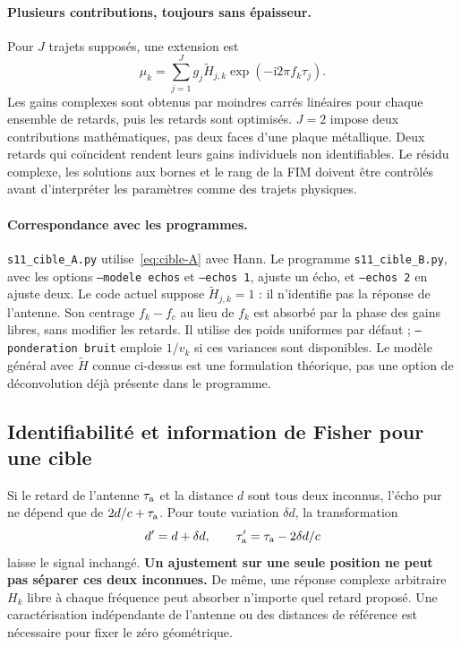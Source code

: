 \documentclass[11pt,a4paper]{article}
\newcommand{\ii}{\mathrm{i}}
\begin{document}
\paragraph{Plusieurs contributions, toujours sans épaisseur.}
Pour $J$ trajets supposés, une extension est
\begin{equation}
 \mu_k=\sum_{j=1}^{J}g_j\widetilde H_{j,k}
               \exp(-\ii2\pi f_k\tau_j).
\end{equation}
Les gains complexes sont obtenus par moindres carrés linéaires pour chaque
ensemble de retards, puis les retards sont optimisés. $J=2$ impose deux
contributions mathématiques, pas deux faces d'une plaque métallique.
Deux retards qui coïncident rendent leurs gains individuels non identifiables.
Le résidu complexe, les solutions aux bornes et le rang de la FIM doivent
être contrôlés avant d'interpréter les paramètres comme des trajets physiques.

\paragraph{Correspondance avec les programmes.}
\texttt{s11\_cible\_A.py} utilise~\eqref{eq:cible-A} avec Hann.
Le programme \texttt{s11\_cible\_B.py}, avec les options
\texttt{--modele echos} et \texttt{--echos 1}, ajuste un écho,
et \texttt{--echos 2} en ajuste deux. Le code actuel suppose
$\widetilde H_{j,k}=1$ : il n'identifie pas la réponse de l'antenne.
Son centrage $f_k-f_c$ au lieu de $f_k$ est absorbé par la phase des gains
libres, sans modifier les retards. Il utilise des poids uniformes par défaut ;
\texttt{--ponderation bruit} emploie $1/v_k$ si ces variances sont disponibles.
Le modèle général avec $\widetilde H$ connue ci-dessus est une formulation
théorique, pas une option de déconvolution déjà présente dans le programme.

\subsection{Identifiabilité et information de Fisher pour une cible}

Si le retard de l'antenne $\tau_{\rm a}$ et la distance $d$ sont tous deux
inconnus, l'écho pur ne dépend que de $2d/c+\tau_{\rm a}$. Pour toute variation
$\delta d$, la transformation
\begin{equation}
 d'=d+\delta d,\qquad \tau_{\rm a}'=\tau_{\rm a}-2\delta d/c
\end{equation}
laisse le signal inchangé. \textbf{Un ajustement sur une seule position ne peut
pas séparer ces deux inconnues.} De même, une réponse complexe arbitraire
$H_k$ libre à chaque fréquence peut absorber n'importe quel retard proposé.
Une caractérisation indépendante de l'antenne ou des distances de référence
est nécessaire pour fixer le zéro géométrique.
\end{document}
